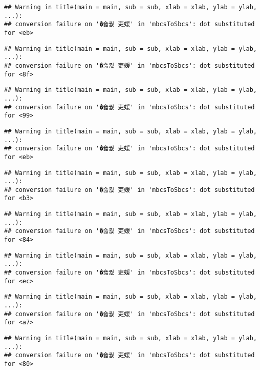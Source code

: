 \documentclass[]{article}
\begin{document}
\begin{verbatim}
## Warning in title(main = main, sub = sub, xlab = xlab, ylab = ylab, ...):
## conversion failure on '�숇퀎 吏媛' in 'mbcsToSbcs': dot substituted for <eb>
\end{verbatim}

\begin{verbatim}
## Warning in title(main = main, sub = sub, xlab = xlab, ylab = ylab, ...):
## conversion failure on '�숇퀎 吏媛' in 'mbcsToSbcs': dot substituted for <8f>
\end{verbatim}

\begin{verbatim}
## Warning in title(main = main, sub = sub, xlab = xlab, ylab = ylab, ...):
## conversion failure on '�숇퀎 吏媛' in 'mbcsToSbcs': dot substituted for <99>
\end{verbatim}

\begin{verbatim}
## Warning in title(main = main, sub = sub, xlab = xlab, ylab = ylab, ...):
## conversion failure on '�숇퀎 吏媛' in 'mbcsToSbcs': dot substituted for <eb>
\end{verbatim}

\begin{verbatim}
## Warning in title(main = main, sub = sub, xlab = xlab, ylab = ylab, ...):
## conversion failure on '�숇퀎 吏媛' in 'mbcsToSbcs': dot substituted for <b3>
\end{verbatim}

\begin{verbatim}
## Warning in title(main = main, sub = sub, xlab = xlab, ylab = ylab, ...):
## conversion failure on '�숇퀎 吏媛' in 'mbcsToSbcs': dot substituted for <84>
\end{verbatim}

\begin{verbatim}
## Warning in title(main = main, sub = sub, xlab = xlab, ylab = ylab, ...):
## conversion failure on '�숇퀎 吏媛' in 'mbcsToSbcs': dot substituted for <ec>
\end{verbatim}

\begin{verbatim}
## Warning in title(main = main, sub = sub, xlab = xlab, ylab = ylab, ...):
## conversion failure on '�숇퀎 吏媛' in 'mbcsToSbcs': dot substituted for <a7>
\end{verbatim}

\begin{verbatim}
## Warning in title(main = main, sub = sub, xlab = xlab, ylab = ylab, ...):
## conversion failure on '�숇퀎 吏媛' in 'mbcsToSbcs': dot substituted for <80>
\end{verbatim}
\end{document}
